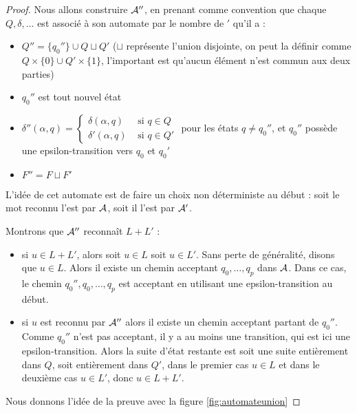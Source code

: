  \begin{proof}
     Nous allons construire $\mathcal A''$, en prenant comme convention que chaque $Q,\delta,\ldots$ est associé à son automate par le nombre de $'$ qu'il a :
     \begin{itemize}[label=$\bullet$]
         \item $Q'' = \{q_0''\} \cup Q \sqcup Q'$ ($\sqcup$ représente l'union disjointe, on peut la définir comme $Q\times \{0\} \cup Q'\times \{1\}$, l'important est qu'aucun élément n'est commun aux deux parties)
         \item $q_0''$ est tout nouvel état
         \item $\delta''(\alpha,q) = \left\{ \begin{array}{ll}
             \delta(\alpha,q) & \text{ si } q\in Q \\
             \delta'(\alpha,q) & \text{ si } q \in Q'
         \end{array} \right.$ pour les états $q\neq q_0''$, et $q_0''$ possède une epsilon-transition vers $q_0$ et $q_0'$
         \item $F'' = F\sqcup F'$
     \end{itemize}

     L'idée de cet automate est de faire un choix non déterministe au début : soit le mot reconnu l'est par $\mathcal A$, soit il l'est par $\mathcal A'$.

     Montrons que $\mathcal A''$ reconnaît $L+L'$ :
     \begin{itemize}[label=$\bullet$]
         \item si $u\in L+L'$, alors soit $u\in L$ soit $u\in L'$. Sans perte de généralité, disons que $u\in L$. Alors il existe un chemin acceptant $q_0,\ldots,q_p$ dans $\mathcal A$. Dans ce cas, le chemin $q_0'',q_0,\ldots,q_p$ est acceptant en utilisant une epsilon-transition au début.
         \item si $u$ est reconnu par $\mathcal A''$ alors il existe un chemin acceptant partant de $q_0''$. Comme $q_0''$ n'est pas acceptant, il y a au moins une transition, qui est ici une epsilon-transition. Alors la suite d'état restante est soit une suite entièrement dans $Q$, soit entièrement dans $Q'$, dans le premier cas $u\in L$ et dans le deuxième cas $u\in L'$, donc $u\in L+L'$.
     \end{itemize}
    Nous donnons l'idée de la preuve avec la figure \ref{fig:automateunion}
 \end{proof}

